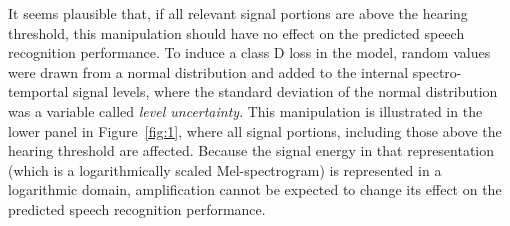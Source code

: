 \documentclass[10pt,a4paper,twocolumn]{article}
\begin{document}
%
It seems plausible that, if all relevant signal portions are above the hearing threshold, this manipulation should have no effect on the predicted speech recognition performance.
%
To induce a class D loss in the model, random values were drawn from a normal distribution and added to the internal spectro-temportal signal levels, where the standard deviation of the normal distribution was a variable called \emph{level uncertainty}.
%
This manipulation is illustrated in the lower panel in Figure~\ref{fig:1}, where all signal portions, including those above the hearing threshold are affected.
%
Because the signal energy in that representation (which is a logarithmically scaled Mel-spectrogram) is represented in a logarithmic domain, amplification cannot be expected to change its effect on the predicted speech recognition performance. 
\end{document}
